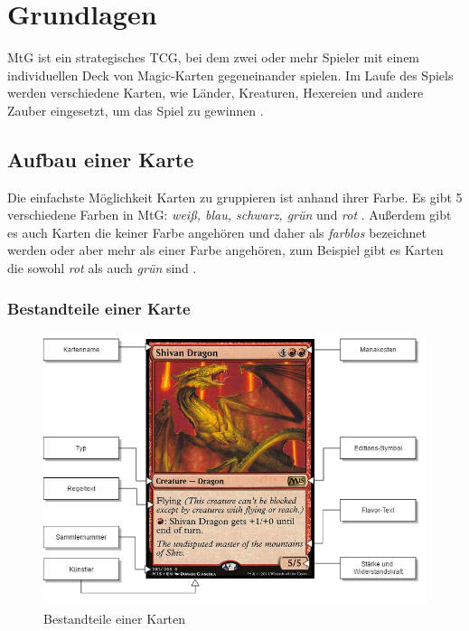 \chapter{Grundlagen}\label{ch:grundlagen}

\ac{MtG} ist ein strategisches \ac{TCG}, bei dem zwei oder mehr Spieler mit einem individuellen Deck von Magic-Karten gegeneinander spielen. Im Laufe des Spiels werden verschiedene Karten, wie Länder, Kreaturen, Hexereien und andere Zauber eingesetzt, um das Spiel zu gewinnen \cite{rulebook:2013}. 

\section{Aufbau einer Karte}\label{ch:grundlagen:aufbau}
Die einfachste Möglichkeit Karten zu gruppieren ist anhand ihrer Farbe. Es gibt 5 verschiedene Farben in \ac{MtG}: \emph{weiß, blau, schwarz, grün} und \emph{rot} \cite{rulebook:2013}. Außerdem gibt es auch Karten die keiner Farbe angehören und daher als \emph{farblos} bezeichnet werden oder aber mehr als einer Farbe angehören, zum Beispiel gibt es Karten die sowohl \emph{rot} als auch \emph{grün} sind \cite{rulebook:2013}.

\subsection{Bestandteile einer Karte}

\begin{figure}[t]
	\myfloatalign
	\includegraphics[width=\textwidth]{gfx/card.png}
	\caption{Bestandteile einer Karten}
	\label{fig:cardparts}
\end{figure}

